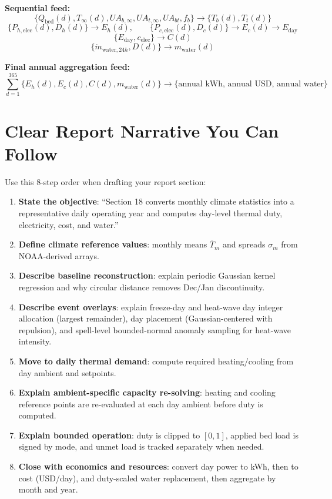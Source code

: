 \documentclass[11pt]{article}
\begin{document}
\textbf{Sequential feed:}
\[
\{Q_{\mathrm{bed}}(d),T_{\infty}(d),UA_{b,\infty},UA_{t,\infty},UA_{bt},f_b\}
\rightarrow
\{T_b(d),T_t(d)\}
\]
\[
\{P_{h,\mathrm{elec}}(d),D_h(d)\}
\rightarrow
E_h(d),
\qquad
\{P_{c,\mathrm{elec}}(d),D_c(d)\}
\rightarrow
E_c(d)
\rightarrow
E_{\mathrm{day}}
\]
\[
\{E_{\mathrm{day}},c_{\mathrm{elec}}\}
\rightarrow
C(d)
\]
\[
\{\dot m_{\mathrm{water},24h},D(d)\}
\rightarrow
m_{\mathrm{water}}(d)
\]

\textbf{Final annual aggregation feed:}
\[
\sum_{d=1}^{365}
\{E_h(d),E_c(d),C(d),m_{\mathrm{water}}(d)\}
\rightarrow
\{\text{annual kWh, annual USD, annual water}\}
\]

\section{Clear Report Narrative You Can Follow}
Use this 8-step order when drafting your report section:
\begin{enumerate}[leftmargin=*]
\item \textbf{State the objective}: ``Section 18 converts monthly climate statistics into a representative daily operating year and computes day-level thermal duty, electricity, cost, and water.''
\item \textbf{Define climate reference values}: monthly means $\bar T_m$ and spreads $\sigma_m$ from NOAA-derived arrays.
\item \textbf{Describe baseline reconstruction}: explain periodic Gaussian kernel regression and why circular distance removes Dec/Jan discontinuity.
\item \textbf{Describe event overlays}: explain freeze-day and heat-wave day integer allocation (largest remainder), day placement (Gaussian-centered with repulsion), and spell-level bounded-normal anomaly sampling for heat-wave intensity.
\item \textbf{Move to daily thermal demand}: compute required heating/cooling from day ambient and setpoints.
\item \textbf{Explain ambient-specific capacity re-solving}: heating and cooling reference points are re-evaluated at each day ambient before duty is computed.
\item \textbf{Explain bounded operation}: duty is clipped to $[0,1]$, applied bed load is signed by mode, and unmet load is tracked separately when needed.
\item \textbf{Close with economics and resources}: convert day power to kWh, then to cost (USD/day), and duty-scaled water replacement, then aggregate by month and year.
\end{enumerate}
\end{document}
